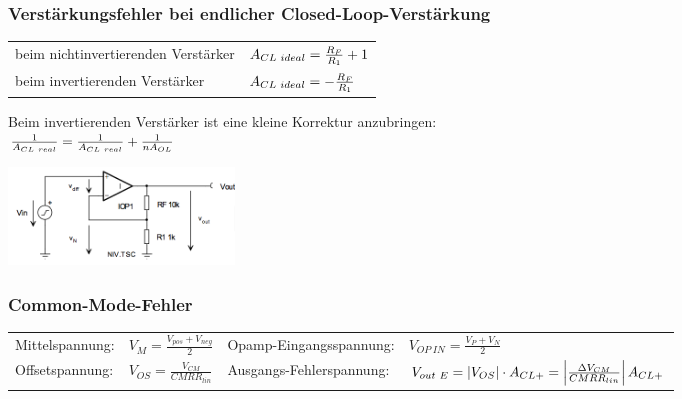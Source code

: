 		\subsubsection{Verstärkungsfehler bei endlicher Closed-Loop-Verstärkung
		}
			\begin{minipage}{12cm}
				\begin{tabular}{ll}
               	beim nichtinvertierenden Verstärker &
               	$A_{CL \hspace{1mm} ideal}=\frac{R_F}{R_1}+1$\\
               	beim invertierenden Verstärker &
                $A_{CL \hspace{1mm}
               	ideal}=-\frac{R_F}{R_1}$\\
         \end{tabular}
               	Beim invertierenden Verstärker ist eine kleine Korrektur
               	anzubringen: \\
               	$\frac{1}{A_{CL \hspace{1mm}
               	real}}=\frac{1}{A_{CL \hspace{1mm} real}}+\frac{1}{nA_{OL}}$\\
	        \end{minipage}
			\begin{minipage}{6cm}
               	\includegraphics[width=6cm]{./bilder/verstaerkungsfaktor.png}
            \end{minipage}

		\subsubsection{Common-Mode-Fehler }
				\begin{tabular}{llll}
					Mittelspannung: &
					$V_M=\frac{V_{pos}+V_{neg}}{2}$ &
					Opamp-Eingangsspannung: &
					$V_{OP\ IN}=\frac{V_P+V_N}{2}$\\					
					Offsetspannung: &
					$V_{OS}=\frac{V_{CM}}{CMRR_{lin}}$ &
					Ausgangs-Fehlerspannung: &
					$V_{out \hspace{1mm} E}=\left|V_{OS}\right| \cdot A_{CL+}=\left|
					\frac{\Delta V_{CM}}{CMRR_{lin}}\right|A_{CL+}$\\
				\end{tabular}
				
